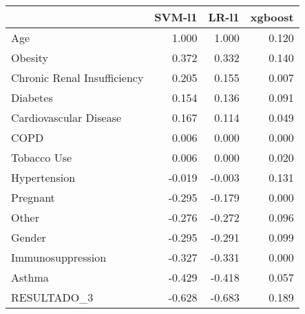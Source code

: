 \begin{tabular}{lrrr}
\toprule
{} &  SVM-l1 &  LR-l1 &  xgboost \\
\midrule
Age                         &   1.000 &  1.000 &    0.120 \\
Obesity                     &   0.372 &  0.332 &    0.140 \\
Chronic Renal Insufficiency &   0.205 &  0.155 &    0.007 \\
Diabetes                    &   0.154 &  0.136 &    0.091 \\
Cardiovascular Disease      &   0.167 &  0.114 &    0.049 \\
COPD                        &   0.006 &  0.000 &    0.000 \\
Tobacco Use                 &   0.006 &  0.000 &    0.020 \\
Hypertension                &  -0.019 & -0.003 &    0.131 \\
Pregnant                    &  -0.295 & -0.179 &    0.000 \\
Other                       &  -0.276 & -0.272 &    0.096 \\
Gender                      &  -0.295 & -0.291 &    0.099 \\
Immunosuppression           &  -0.327 & -0.331 &    0.000 \\
Asthma                      &  -0.429 & -0.418 &    0.057 \\
RESULTADO\_3                 &  -0.628 & -0.683 &    0.189 \\
\bottomrule
\end{tabular}
